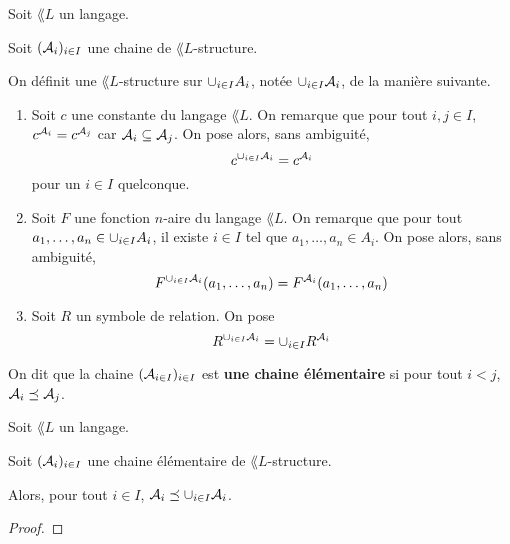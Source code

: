 \documentclass[a4paper, 12pt]{report}
\begin{document}
\begin{definition} 
	Soit $\lang{L}$ un langage.

	Soit $(\mathcal{A}_{i})_{i \in I}$ une chaine de $\lang{L}$-structure.

	On définit une $\lang{L}$-structure sur $\cup_{i \in I} A_{i}$, notée
	$\cup_{i \in I} \mathcal{A}_{i}$, de la manière suivante.

	\begin{enumerate}
		\item Soit $c$ une constante du langage $\lang{L}$. On remarque que pour
			tout $i, j \in I$, $c^{\mathcal{A}_{i}} = c^{\mathcal{A}_{j}}$ car
			$\mathcal{A}_{i} \subseteq \mathcal{A}_{j}$. On pose alors, sans
			ambiguité,
			\begin{equation}
				c^{\cup_{i \in I} \mathcal{A}_{i}} = c^{\mathcal{A}_{i}}
			\end{equation}
			pour un $i \in I$ quelconque.
		\item Soit $F$ une fonction $n$-aire du langage $\lang{L}$. On remarque
			que pour tout $a_{1}, \dots, a_{n} \in \cup_{i \in I} A_{i}$, il
			existe $i \in I$ tel que $a_{1}, \dots, a_{n} \in A_{i}$. On pose
			alors, sans ambiguité,
			\begin{equation}
				F^{\cup_{i \in I} \mathcal{A}_{i}}(a_{1}, \dots, a_{n}) =
				F^{\mathcal{A}_{i}}(a_{1}, \dots, a_{n})
			\end{equation}
		\item Soit $R$ un symbole de relation. On pose
			\begin{equation}
				R^{\cup_{i \in I} \mathcal{A}_{i}} = \cup_{i \in I}
				R^{\mathcal{A}_{i}}
			\end{equation}
	\end{enumerate}

	On dit que la chaine $(\mathcal{A}_{i \in I})_{i \in I}$ est \textbf{une
	chaine élémentaire} si pour tout $i < j$, $\mathcal{A}_{i}
	\preceq \mathcal{A}_{j}$.
\end{definition}

\begin{lemma}
	Soit $\lang{L}$ un langage.

	Soit $(\mathcal{A}_{i})_{i \in I}$ une chaine élémentaire de $\lang{L}$-structure.

	Alors, pour tout $i \in I$, $\mathcal{A}_{i} \preceq \cup_{i \in
	I} \mathcal{A}_{i}$.
\end{lemma}

\ifdefined\outputproof
\begin{proof}

\end{proof}
\fi
\end{document}
